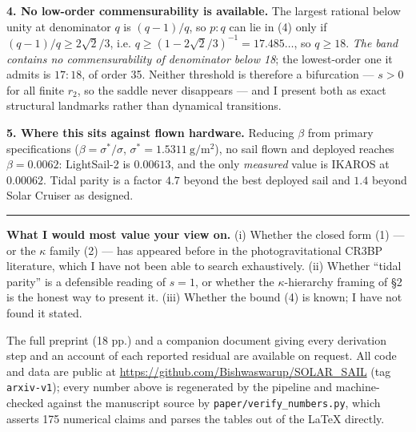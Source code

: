 \documentclass[11pt,a4paper]{article}
\begin{document}
\medskip
\noindent\textbf{4. No low-order commensurability is available.}
The largest rational below unity at denominator $q$ is $(q-1)/q$, so
$p{:}q$ can lie in (4) only if $(q-1)/q\geq2\sqrt2/3$, i.e.
$q\geq(1-2\sqrt2/3)^{-1}=17.485\ldots$, so $q\geq18$. \emph{The band contains
no commensurability of denominator below 18}; the lowest-order one it admits is
$17{:}18$, of order 35. Neither threshold is therefore a bifurcation --- $s>0$
for all finite $r_2$, so the saddle never disappears --- and I present both as
exact structural landmarks rather than dynamical transitions.

\medskip
\noindent\textbf{5. Where this sits against flown hardware.}
Reducing $\beta$ from primary specifications ($\beta=\sigma^\ast/\sigma$,
$\sigma^\ast=\SI{1.5311}{\gram\per\metre\squared}$), no sail flown and deployed
reaches $\beta=0.0062$: LightSail-2 is $0.00613$, and the only \emph{measured}
value is IKAROS at $0.00062$. Tidal parity is a factor $4.7$ beyond the best
deployed sail and $1.4$ beyond Solar Cruiser as designed.

\medskip
\hrule
\vspace{4pt}
\noindent\small
\textbf{What I would most value your view on.} (i) Whether the closed
form (1) --- or the $\kappa$ family (2) --- has appeared before in the
photogravitational CR3BP literature, which I have not been able to search
exhaustively. (ii) Whether ``tidal parity'' is a defensible reading of $s=1$, or
whether the $\kappa$-hierarchy framing of \S2 is the honest way to present it.
(iii) Whether the bound (4) is known; I have not found it stated.

\smallskip
\noindent
The full preprint (18 pp.) and a companion document giving every derivation
step and an account of each reported residual are available on request. All
code and data are public at
\url{https://github.com/Bishwaswarup/SOLAR_SAIL} (tag \texttt{arxiv-v1});
every number above is regenerated by the pipeline and machine-checked against
the manuscript source by \texttt{paper/verify\_numbers.py}, which asserts 175
numerical claims and parses the tables out of the \LaTeX{} directly.
\end{document}
